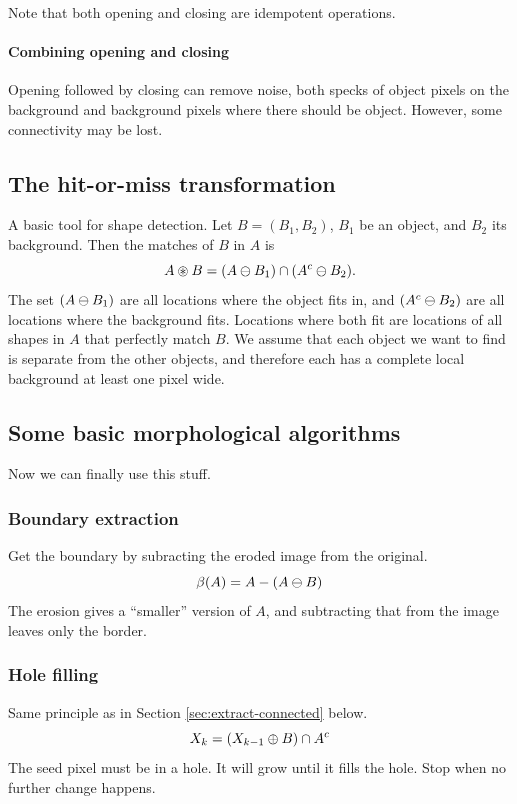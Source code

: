 Note that both opening and closing are idempotent operations.

\paragraph{Combining opening and closing}
Opening followed by closing can remove noise, both specks of object pixels on the background and background pixels where there should be object. However, some connectivity may be lost.

\subsection{The hit-or-miss transformation}
A basic tool for shape detection. Let $B = (B_1, B_2)$, $B_1$ be an object, and $B_2$ its background. Then the matches of $B$ in $A$ is
\begin{equation}
    A \circledast B = (A \ominus B_1) \cap (A^c \ominus B_2).
\end{equation}
The set $(A \ominus B_1)$ are all locations where the object fits in, and $(A^c \ominus B_2)$ are all locations where the background fits. Locations where both fit are locations of all shapes in $A$ that perfectly match $B$. We assume that each object we want to find is separate from the other objects, and therefore each has a complete local background at least one pixel wide.

\subsection{Some basic morphological algorithms}
Now we can finally use this stuff.

\subsubsection{Boundary extraction}
Get the boundary by subracting the eroded image from the original.
\begin{equation}
    \beta(A) = A - (A \ominus B)
\end{equation}
The erosion gives a ``smaller'' version of $A$, and subtracting that from the image leaves only the border.

\subsubsection{Hole filling}
Same principle as in Section \ref{sec:extract-connected} below.
\begin{equation}
    X_k = (X_{k-1} \oplus B) \cap A^c
\end{equation}
The seed pixel must be in a hole. It will grow until it fills the hole. Stop when no further change happens.

